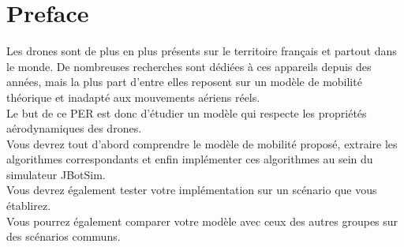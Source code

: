 \documentclass[12pt,a4paper]{article}
\begin{document}
\setcounter{page}{0}

\newpage
\tableofcontents
\newpage
\listoffigures
\newpage

\section*{Preface}
Les drones sont de plus en plus présents sur le territoire français et partout dans le monde. De nombreuses recherches sont dédiées à ces appareils depuis des années, mais la plus part d’entre elles reposent sur un modèle de mobilité théorique et inadapté aux mouvements aériens réels.\\

Le but de ce PER est donc d’étudier un modèle qui respecte les propriétés aérodynamiques des drones.\\

Vous devrez tout d’abord comprendre le modèle de mobilité proposé,  extraire les algorithmes correspondants et enfin implémenter ces algorithmes au sein du simulateur JBotSim.\\ 
Vous devrez également tester votre implémentation sur un scénario que vous établirez.\\

Vous pourrez également comparer votre modèle avec ceux des autres groupes sur des scénarios communs.\\

\newpage

\newpage

\newpage

\newpage

\newpage

\newpage

\newpage

\newpage

\newpage

\newpage

\newpage

\newpage
{}
\nocite{*}


\end{document}
